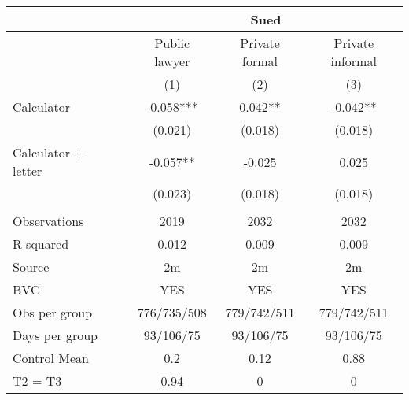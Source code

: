 \begin{tabular}{lcccc}
\toprule
      &       & \multicolumn{3}{c}{Sued} \\
\midrule
\midrule
      &       & Public lawyer & Private formal & Private informal \\
\cmidrule{3-5}      &       & (1)   & (2)   & (3) \\
\midrule
\midrule
Calculator &       & -0.058*** & 0.042** & -0.042** \\
      &       & (0.021) & (0.018) & (0.018) \\
Calculator + letter &       & -0.057** & -0.025 & 0.025 \\
      &       & (0.023) & (0.018) & (0.018) \\
      &       &       &       &  \\
\midrule
Observations &       & 2019  & 2032  & 2032 \\
R-squared &       & 0.012 & 0.009 & 0.009 \\
Source &       & 2m    & 2m    & 2m \\
BVC   &       & YES   & YES   & YES \\
Obs per group &       & 776/735/508 & 779/742/511 & 779/742/511 \\
Days per group &       & 93/106/75 & 93/106/75 & 93/106/75 \\
Control Mean &       & 0.2   & 0.12  & 0.88 \\
T2 = T3 &       & 0.94  & 0     & 0 \\
\bottomrule
\bottomrule
\end{tabular}%
